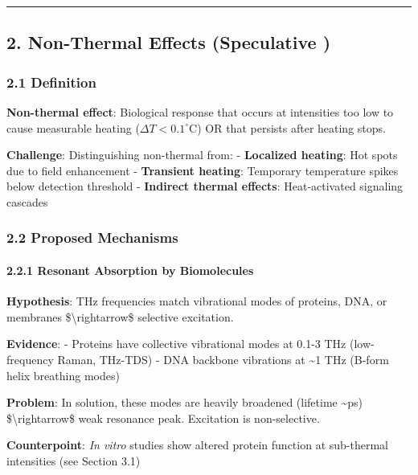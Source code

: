\begin{center}\rule{0.5\linewidth}{0.5pt}\end{center}

\subsection{2. Non-Thermal Effects (Speculative
)}\label{non-thermal-effects-speculative}

\subsubsection{2.1 Definition}\label{definition}

\textbf{Non-thermal effect}: Biological response that occurs at
intensities too low to cause measurable heating
(\(\Delta T < 0.1^\circ\)C) OR that persists after heating stops.

\textbf{Challenge}: Distinguishing non-thermal from: - \textbf{Localized
heating}: Hot spots due to field enhancement - \textbf{Transient
heating}: Temporary temperature spikes below detection threshold -
\textbf{Indirect thermal effects}: Heat-activated signaling cascades

\subsubsection{2.2 Proposed Mechanisms}\label{proposed-mechanisms}

\paragraph{2.2.1 Resonant Absorption by
Biomolecules}\label{resonant-absorption-by-biomolecules}

\textbf{Hypothesis}: THz frequencies match vibrational modes of
proteins, DNA, or membranes \$\textbackslash rightarrow\$ selective
excitation.

\textbf{Evidence}: - Proteins have collective vibrational modes at 0.1-3
THz (low-frequency Raman, THz-TDS) - DNA backbone vibrations at
\textasciitilde1 THz (B-form helix breathing modes)

\textbf{Problem}: In solution, these modes are heavily broadened
(lifetime \textasciitilde ps) \$\textbackslash rightarrow\$ weak
resonance peak. Excitation is non-selective.

\textbf{Counterpoint}: \emph{In vitro} studies show altered protein
function at sub-thermal intensities (see Section 3.1)

